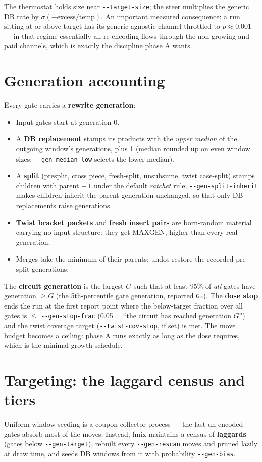 \documentclass[11pt]{article}
\newcommand{\code}[1]{\texttt{#1}}
\begin{document}
The thermostat holds size near \code{-{}-target-size}; the steer multiplies
the generic DB rate by $\sigma(-\text{excess}/\text{temp})$. An important
measured consequence: a run sitting at or above target has its generic
agnostic channel throttled to $p\approx 0.001$ --- in that regime
essentially all re-encoding flows through the non-growing and paid
channels, which is exactly the discipline phase A wants.

\section{Generation accounting}\label{sec:gen}
Every gate carries a \textbf{rewrite generation}:
\begin{itemize}
\item Input gates start at generation 0.
\item A \textbf{DB replacement} stamps its products with the \emph{upper
median} of the outgoing window's generations, plus 1 (median rounded up on
even window sizes; \code{-{}-gen-median-low} selects the lower median).
\item A \textbf{split} (presplit, cross piece, fresh-split, unsubsume,
twist case-split) stamps children with parent $+\,1$ under the default
\emph{ratchet} rule; \code{-{}-gen-split-inherit} makes children inherit the
parent generation unchanged, so that only DB replacements raise
generations.
\item \textbf{Twist bracket packets} and \textbf{fresh insert pairs} are
born-random material carrying no input structure: they get MAXGEN, higher
than every real generation.
\item Merges take the minimum of their parents; undos restore the recorded
pre-split generations.
\end{itemize}
The \textbf{circuit generation} is the largest $G$ such that at least 95\%
of \emph{all} gates have generation $\geq G$ (the 5th-percentile gate
generation, reported \code{G=}). The \textbf{dose stop} ends the run at the
first report point where the below-target fraction over all gates is
$\leq$ \code{-{}-gen-stop-frac} (0.05 = ``the circuit has reached generation
$G$'') and the twist coverage target (\code{-{}-twist-cov-stop}, if set) is
met. The move budget becomes a ceiling: phase A runs exactly as long as the
dose requires, which is the minimal-growth schedule.

\section{Targeting: the laggard census and tiers}
Uniform window seeding is a coupon-collector process --- the last
un-encoded gates absorb most of the moves. Instead, fmix maintains a census
of \textbf{laggards} (gates below \code{-{}-gen-target}), rebuilt every
\code{-{}-gen-rescan} moves and pruned lazily at draw time, and seeds DB
windows from it with probability \code{-{}-gen-bias}.
\end{document}

